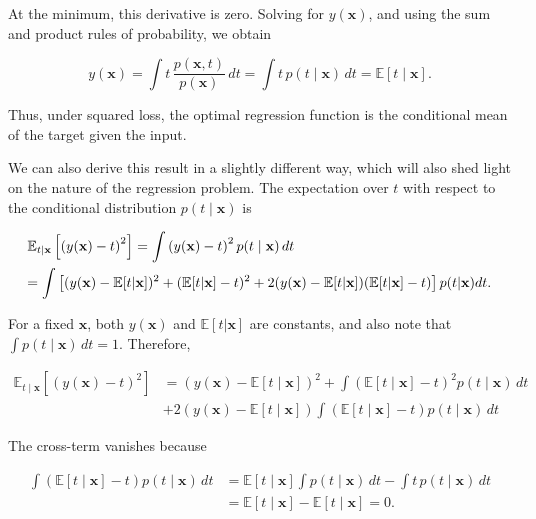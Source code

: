 \documentclass[10pt,twocolumn]{memoir}
\begin{document}
At the minimum, this derivative is zero. Solving for $y(\mathbf{x})$, and using the sum and product rules of probability, we obtain

\begin{equation}
    y(\mathbf{x}) = \int t\,\frac{p(\mathbf{x},t)}{p(\mathbf{x})}\,dt = \int t\,p(t\mid\mathbf{x})\,dt = \mathbb{E}[t\mid\mathbf{x}].
\label{eq:c1_regression_function}
\end{equation}

Thus, under squared loss, the optimal regression function is the conditional mean of the target given the input.

We can also derive this result in a slightly different way, which will also shed light on the nature of the regression problem. The expectation over $t$ with respect to the conditional distribution $p(t\mid\mathbf{x})$ is

\begin{equation}
\begin{aligned}
    &\mathbb{E}_{t|\mathbf{x}}\left[\left(y(\mathbf{x})-t\right)^2\right] = \int \left(y(\mathbf{x})-t\right)^2 p(t\mid\mathbf{x})\,dt \\
    &\hspace{-0.3em}= \int \left[(y(\mathbf{x}) - \mathbb{E}[t|\mathbf{x}])^2 + (\mathbb{E}[t|\mathbf{x}]-t)^2 + 2(y(\mathbf{x})-\mathbb{E}[t|\mathbf{x}])(\mathbb{E}[t|\mathbf{x}]-t)\right]p(t|\mathbf{x})dt.
\end{aligned}
\end{equation}

For a fixed $\mathbf{x}$, both $y(\mathbf{x})$ and $\mathbb{E}[t|\mathbf{x}]$ are constants, and also note that $\int p(t\mid\mathbf{x})\,dt = 1$. Therefore,

\begin{equation}
\begin{aligned}
    \mathbb{E}_{t\mid\mathbf{x}}\left[\left(y(\mathbf{x})-t\right)^2\right]
    &= \left(y(\mathbf{x}) - \mathbb{E}[t\mid\mathbf{x}]\right)^2 + \int\left(\mathbb{E}[t\mid\mathbf{x}] - t\right)^2p(t\mid\mathbf{x})\,dt \\
    &+ 2\left(y(\mathbf{x}) - \mathbb{E}[t\mid\mathbf{x}]\right)\int\left(\mathbb{E}[t\mid\mathbf{x}] - t\right)p(t\mid\mathbf{x})\,dt
\end{aligned}
\end{equation}

The cross-term vanishes because

\begin{equation}
\begin{aligned}
    \int \left(\mathbb{E}[t\mid\mathbf{x}] - t\right)p(t\mid\mathbf{x})\,dt
    &= \mathbb{E}[t\mid\mathbf{x}]\int p(t\mid\mathbf{x})\,dt - \int t\,p(t\mid\mathbf{x})\,dt \\
    &= \mathbb{E}[t\mid\mathbf{x}] - \mathbb{E}[t\mid\mathbf{x}] = 0.
\end{aligned}
\end{equation}
\end{document}
